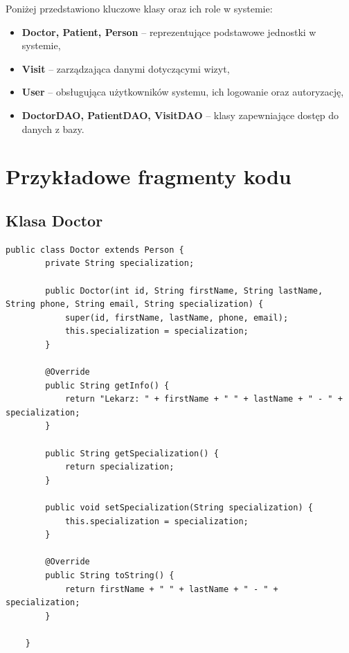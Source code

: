 Poniżej przedstawiono kluczowe klasy oraz ich role w systemie:

\begin{itemize}
\item \textbf{Doctor, Patient, Person} -- reprezentujące podstawowe jednostki w systemie,
\item \textbf{Visit} -- zarządzająca danymi dotyczącymi wizyt,
\item \textbf{User} -- obsługująca użytkowników systemu, ich logowanie oraz autoryzację,
\item \textbf{DoctorDAO, PatientDAO, VisitDAO} -- klasy zapewniające dostęp do danych z bazy.
\end{itemize}

\clearpage
\section{Przykładowe fragmenty kodu}

\subsection{Klasa Doctor}
\begin{lstlisting}[style=javaStyle,caption={Klasa reprezentująca lekarza — rozszerzenie klasy Person}]
public class Doctor extends Person {
        private String specialization;

        public Doctor(int id, String firstName, String lastName, String phone, String email, String specialization) {
            super(id, firstName, lastName, phone, email);
            this.specialization = specialization;
        }

        @Override
        public String getInfo() {
            return "Lekarz: " + firstName + " " + lastName + " - " + specialization;
        }

        public String getSpecialization() {
            return specialization;
        }

        public void setSpecialization(String specialization) {
            this.specialization = specialization;
        }

        @Override
        public String toString() {
            return firstName + " " + lastName + " - " + specialization;
        }

    }
\end{lstlisting}


